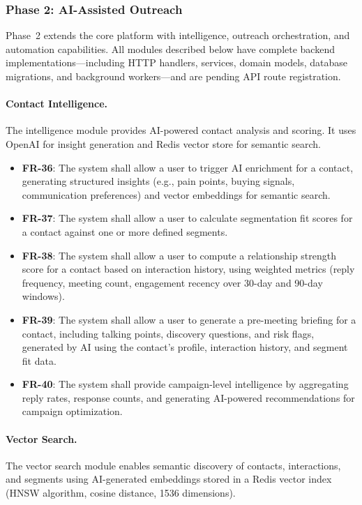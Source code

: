 \subsubsection{Phase 2: AI-Assisted Outreach}

Phase~2 extends the core platform with intelligence, outreach orchestration, and automation capabilities. All modules described below have complete backend implementations---including HTTP handlers, services, domain models, database migrations, and background workers---and are pending API route registration.

\paragraph{Contact Intelligence.}
The intelligence module provides AI-powered contact analysis and scoring. It uses OpenAI for insight generation and Redis vector store for semantic search.

\begin{itemize}
    \item \textbf{FR-36}: The system shall allow a user to trigger AI enrichment for a contact, generating structured insights (e.g., pain points, buying signals, communication preferences) and vector embeddings for semantic search.
    \item \textbf{FR-37}: The system shall allow a user to calculate segmentation fit scores for a contact against one or more defined segments.
    \item \textbf{FR-38}: The system shall allow a user to compute a relationship strength score for a contact based on interaction history, using weighted metrics (reply frequency, meeting count, engagement recency over 30-day and 90-day windows).
    \item \textbf{FR-39}: The system shall allow a user to generate a pre-meeting briefing for a contact, including talking points, discovery questions, and risk flags, generated by AI using the contact's profile, interaction history, and segment fit data.
    \item \textbf{FR-40}: The system shall provide campaign-level intelligence by aggregating reply rates, response counts, and generating AI-powered recommendations for campaign optimization.
\end{itemize}

\paragraph{Vector Search.}
The vector search module enables semantic discovery of contacts, interactions, and segments using AI-generated embeddings stored in a Redis vector index (HNSW algorithm, cosine distance, 1536 dimensions).

